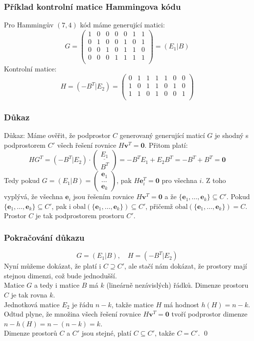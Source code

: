 \documentclass{beamer}
\newcommand{\vv}{\textbf{v}}
\newcommand{\e}{\textbf{e}}
\renewcommand{\span}{\mbox{obal}}
\newcommand{\zero}{\textbf{0}}
\newcommand{\emptyline}{\\$\,$\\}
\begin{document}
\begin{frame}[t,fragile]\frametitle{Příklad kontrolní matice Hammingova kódu} 
Pro Hammingův $(7,4)$ kód máme generující matici:
$$
G=
\begin{pmatrix}
1&0&0&0&0&1&1\\
0&1&0&0&1&0&1\\
0&0&1&0&1&1&0\\
0&0&0&1&1&1&1\\
\end{pmatrix}
=
(E_1|B)
$$
Kontrolní matice:
$$
H=(-B^T|E_2)=
\begin{pmatrix}
0&1&1&1&1&0&0\\
1&0&1&1&0&1&0\\
1&1&0&1&0&0&1\\
\end{pmatrix}
$$
\end{frame}



\begin{frame}[t,fragile]\frametitle{Důkaz} 
    Důkaz: Máme ověřit, že podprostor $C$ generovaný generující maticí $G$ je shodný s podprostorem $C'$ všech řešení rovnice $H\vv^T=\zero$. Přitom platí:
    $$
HG^T=\left(-B^T|E_2\right)\cdot\left(
\begin{matrix}
\underline{E_1}\\
B^T
\end{matrix}
\right)
=-B^TE_1+E_2B^T=-B^T+B^T=\zero
    $$
    Tedy pokud $G=(E_1|B)=\begin{pmatrix}
    \e_1\\\dots\\\e_k
    \end{pmatrix}$, pak $H\e_i^T=\zero$ pro všechna $i$. Z toho vyplývá, že všechna $\e_i$ jsou řešením rovnice $H\vv^T=\zero$ a že $\{\e_1,\dots,\e_k\}\subseteq C'$. Pokud $\{\e_1,\dots,\e_k\}\subseteq C'$, pak i $\span(\{\e_1,\dots,\e_k\})\subseteq C'$, přičemž $\span(\{\e_1,\dots,\e_k\})=C$. Prostor $C$ je tak podprostorem prostoru $C'$.
\end{frame}

\begin{frame}[t,fragile]\frametitle{Pokračování důkazu} 
$$
G=(E_1|B),\quad H=(-B^T|E_2)
$$
Nyní můžeme dokázat, že platí i $C\supseteq C'$, ale stačí nám dokázat, že prostory mají stejnou dimenzi, což bude jednodušší. 
\emptyline
Matice $G$ a tedy i matice $B$ má $k$ (lineárně nezávislých) řádků. Dimenze prostoru $C$ je tak rovna $k$.
\emptyline 
Jednotková matice $E_2$ je řádu $n-k$, takže matice $H$ má hodnost $h(H)=n-k$. Odtud plyne, že množina všech řešení rovnice $H\vv^T=\zero$ tvoří podprostor dimenze $n-h(H)=n-(n-k)=k$.
\emptyline
Dimenze prostorů $C$ a $C'$ jsou stejné, platí $C\subseteq C'$, takže $C=C'$. \qed
\end{frame}
\end{document}
